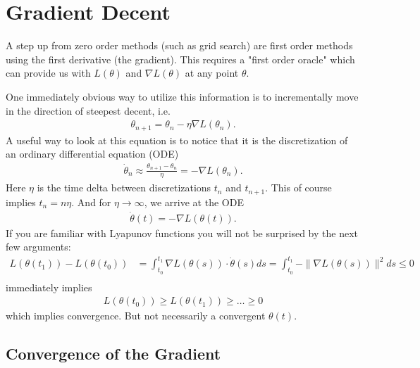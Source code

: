 
\newcommand{\identity}{\mathbb{I}}
\newcommand{\diag}{\text{diag}}
\newcommand{\rate}{\text{rate}}

\chapter{Gradient Decent}

A step up from zero order methods (such as grid search) are first order methods
using the first derivative (the gradient). This requires a "first order oracle"
which can provide us with \(L(\theta)\) and \(\nabla L(\theta)\) at any point
\(\theta\).

One immediately obvious way to utilize this information is to
incrementally move in the direction of steepest decent, i.e.
%
\begin{align*}
	\theta_{n+1} = \theta_n - \eta\nabla L(\theta_n).
\end{align*}
%
A useful way to look at this equation is to notice that it is the
discretization of an ordinary differential equation (ODE)
%
\begin{align*}
	\dot{\theta}_n \approx \frac{\theta_{n+1} - \theta_n}{\eta}
	= - \nabla L(\theta_n).
\end{align*}
%
Here \(\eta\) is the time delta between discretizations \(t_n\) and \(t_{n+1}\).
This of course implies \(t_n = n\eta\). And for \(\eta\to\infty\), we arrive
at the ODE
%
\begin{align}\label{eq: velocity is gradient}
	\dot{\theta}(t) = -\nabla L(\theta(t)).
\end{align}
%
If you are familiar with Lyapunov functions you will not be surprised by the next
few arguments:
%
\begin{align*}
	L(\theta(t_1)) - L(\theta(t_0))
	&= \int_{t_0}^{t_1} \nabla L(\theta(s)) \cdot \dot{\theta}(s) ds
	= \int_{t_0}^{t_1} -\|\nabla L(\theta(s))\|^2 ds
	\le 0\\
\end{align*}
%
immediately implies
\begin{align*}
	L(\theta(t_0)) \ge L(\theta(t_1)) \ge \dots \ge 0
\end{align*}
which implies convergence. But not necessarily a convergent \(\theta(t)\).

\section{Convergence of the Gradient}

